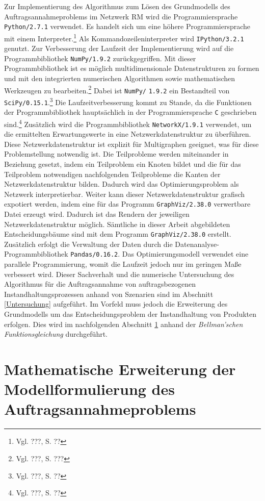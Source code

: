 Zur Implementierung des Algorithmus zum Lösen des Grundmodells des Auftragsannahmeproblems im Netzwerk RM wird die Programmiersprache \texttt{Python/2.7.1} verwendet. Es handelt sich um eine höhere Programmiersprache mit einem Interpreter.\footnote{Vgl. ???, S. ??} Als  Kommandozeileninterpreter wird \texttt{IPython/3.2.1} genutzt. Zur Verbesserung der Laufzeit der Implementierung wird auf die Programmbibliothek \texttt{NumPy/}\texttt{1.9.2} zurückgegriffen. Mit dieser Programmbibliothek ist es möglich multidimensionale Datenstrukturen zu formen und mit den integrierten numerischen Algorithmen sowie mathematischen Werkzeugen zu bearbeiten.\footnote{Vgl. ???, S. ???} Dabei ist \texttt{NumPy/} \texttt{1.9.2} ein Bestandteil von \texttt{SciPy/0.15.1}.\footnote{Vgl. ???, S. ??} Die Laufzeitverbesserung kommt zu Stande, da die Funktionen der Programmbibliothek hauptsächlich in der Programmiersprache \texttt{C} geschrieben sind.\footnote{Vgl. ???, S. ??} Zusätzlich wird die Programmbibliothek \texttt{NetworkX/1.9.1} verwendet, um die ermittelten Erwartungswerte in eine Netzwerkdatenstruktur zu überführen. Diese Netzwerkdatenstruktur ist explizit für Multigraphen geeignet, was für diese Problemstellung notwendig ist. Die Teilprobleme werden miteinander in Beziehung gesetzt, indem ein Teilproblem ein Knoten bildet und die für das Teilproblem notwendigen nachfolgenden Teilprobleme die Kanten der Netzwerkdatenstruktur bilden. Dadurch wird das Optimierungsproblem als Netzwerk interpretierbar. Weiter kann dieser Netzwerkdatenstruktur grafisch expotiert werden, indem eine für das Programm \texttt{GraphViz/2.38.0} verwertbare Datei erzeugt wird. Dadurch ist das Rendern der jeweiligen Netzwerkdatenstruktur möglich. Sämtliche in dieser Arbeit abgebildeten Entscheidungsbäume sind mit dem Programm \texttt{GraphViz/2.38.0} erstellt. Zusätzlich erfolgt die Verwaltung der Daten durch die Datenanalyse-Programmbibliothek \texttt{Pandas/0.16.2}. Das Optimierungsmodell verwendet eine parallele Programmierung, womit die Laufzeit jedoch nur im geringen Maße verbessert wird. Dieser Sachverhalt und die numerische Untersuchung des Algorithmus für die Auftragsannahme von auftragsbezogenen Instandhaltungsprozessen anhand von Szenarien sind im Abschnitt \ref{Untersuchung} aufgeführt. Im Vorfeld muss jedoch die Erweiterung des Grundmodells um das Entscheidungsproblem der Instandhaltung von Produkten erfolgen. Dies wird im nachfolgenden Abschnitt \ref{Umformung} anhand der \textit{Bellman'schen Funktionsgleichung} durchgeführt.


\section{Mathematische Erweiterung der Modellformulierung des Auftragsannahmeproblems}\label{Umformung}

